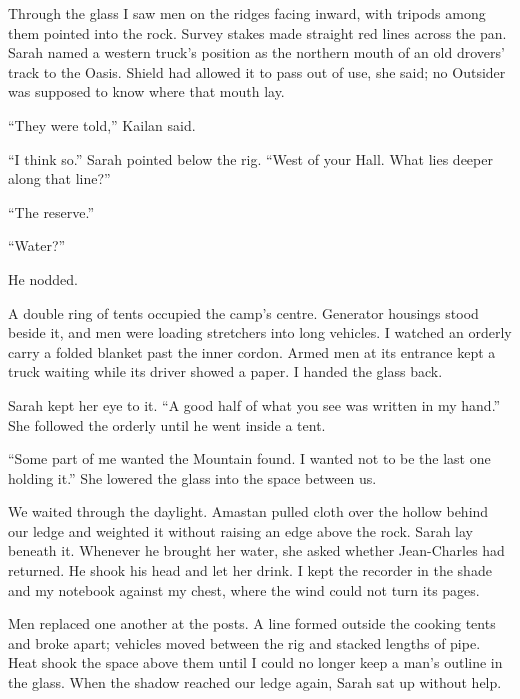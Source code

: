 Through the glass I saw men on the ridges facing inward, with tripods among them pointed into the rock. Survey stakes made straight red lines across the pan. Sarah named a western truck's position as the northern mouth of an old drovers' track to the Oasis. Shield had allowed it to pass out of use, she said; no Outsider was supposed to know where that mouth lay.\par

``They were told,'' Kailan said.\par

``I think so.'' Sarah pointed below the rig. ``West of your Hall. What lies deeper along that line?''\par

``The reserve.''\par

``Water?''\par

He nodded.\par

A double ring of tents occupied the camp's centre. Generator housings stood beside it, and men were loading stretchers into long vehicles. I watched an orderly carry a folded blanket past the inner cordon. Armed men at its entrance kept a truck waiting while its driver showed a paper. I handed the glass back.\par

Sarah kept her eye to it. ``A good half of what you see was written in my hand.'' She followed the orderly until he went inside a tent.\par

``Some part of me wanted the Mountain found. I wanted not to be the last one holding it.'' She lowered the glass into the space between us.\par

We waited through the daylight. Amastan pulled cloth over the hollow behind our ledge and weighted it without raising an edge above the rock. Sarah lay beneath it. Whenever he brought her water, she asked whether Jean-Charles had returned. He shook his head and let her drink. I kept the recorder in the shade and my notebook against my chest, where the wind could not turn its pages.\par

Men replaced one another at the posts. A line formed outside the cooking tents and broke apart; vehicles moved between the rig and stacked lengths of pipe. Heat shook the space above them until I could no longer keep a man's outline in the glass. When the shadow reached our ledge again, Sarah sat up without help.\par

